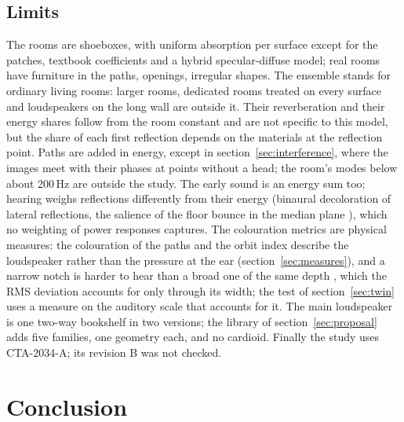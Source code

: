 \documentclass[11pt,a4paper]{article}
\begin{document}
\subsection{Limits}
\label{sec:limits}

The rooms are shoeboxes, with uniform absorption per surface except for the patches, textbook
coefficients and a hybrid specular-diffuse model; real rooms have furniture in the paths, openings,
irregular shapes. The ensemble stands for ordinary living rooms: larger rooms, dedicated rooms treated
on every surface and loudspeakers on the long wall are outside it. Their reverberation and their energy shares follow from the room constant and are
not specific to this model, but the share of each first reflection depends on the materials at the
reflection point. Paths are added in energy, except in section~\ref{sec:interference}, where the
images meet with their phases at points without a head; the room's modes below about 200\,Hz are
outside the study. The early sound is an energy sum too; hearing weighs
reflections differently from their energy (binaural decoloration of lateral reflections, the
salience of the floor bounce in the median plane \cite{bech1996,olive1989}), which no weighting of
power responses captures. The colouration metrics are physical measures: the colouration of the paths
and the orbit index describe the loudspeaker rather than the pressure at the ear (section~\ref{sec:measures}),
and a narrow notch is harder to hear than a broad one of the same depth \cite{bucklein1981}, which the RMS
deviation accounts for only through its width; the test of section~\ref{sec:twin} uses a measure on the
auditory scale that accounts for it. The main loudspeaker is one two-way bookshelf in two versions; the library of
section~\ref{sec:proposal} adds five families, one geometry each, and no cardioid.
Finally the study uses CTA-2034-A; its revision B was not checked.

\section{Conclusion}
\end{document}
